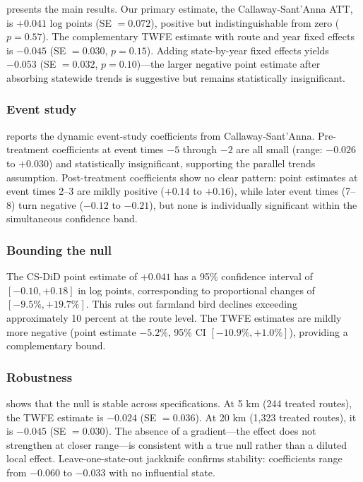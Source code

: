 \documentclass[12pt]{article}
\begin{document}




 presents the main results. Our primary estimate, the Callaway-Sant'Anna ATT, is $+0.041$ log points (SE $= 0.072$), positive but indistinguishable from zero ($p = 0.57$). The complementary TWFE estimate with route and year fixed effects is $-0.045$ (SE $= 0.030$, $p = 0.15$). Adding state-by-year fixed effects yields $-0.053$ (SE $= 0.032$, $p = 0.10$)---the larger negative point estimate after absorbing statewide trends is suggestive but remains statistically insignificant.



\subsubsection*{Event study}  reports the dynamic event-study coefficients from Callaway-Sant'Anna. Pre-treatment coefficients at event times $-5$ through $-2$ are all small (range: $-0.026$ to $+0.030$) and statistically insignificant, supporting the parallel trends assumption. Post-treatment coefficients show no clear pattern: point estimates at event times 2--3 are mildly positive ($+0.14$ to $+0.16$), while later event times (7--8) turn negative ($-0.12$ to $-0.21$), but none is individually significant within the simultaneous confidence band.

\subsubsection*{Bounding the null} The CS-DiD point estimate of $+0.041$ has a 95\% confidence interval of $[-0.10, +0.18]$ in log points, corresponding to proportional changes of $[-9.5\%, +19.7\%]$. This rules out farmland bird declines exceeding approximately 10 percent at the route level. The TWFE estimates are mildly more negative (point estimate $-5.2\%$, 95\% CI $[-10.9\%, +1.0\%]$), providing a complementary bound.



\subsubsection*{Robustness}  shows that the null is stable across specifications. At 5 km (244 treated routes), the TWFE estimate is $-0.024$ (SE $= 0.036$). At 20 km (1,323 treated routes), it is $-0.045$ (SE $= 0.030$). The absence of a gradient---the effect does not strengthen at closer range---is consistent with a true null rather than a diluted local effect. Leave-one-state-out jackknife confirms stability: coefficients range from $-0.060$ to $-0.033$ with no influential state.
\end{document}
